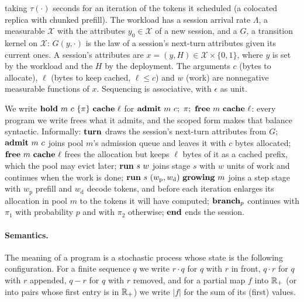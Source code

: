 \begin{definition}
taking $\tau(\cdot)$ seconds for an iteration of the tokens it scheduled
(a colocated replica with chunked prefill). The workload has a session arrival rate $\Lambda$, a
measurable  $\mathcal X$ with the attributes $y_0\in\mathcal X$ of
a new session, and a  $G$, a transition kernel on $\mathcal X$:
$G(y,\cdot)$ is the law of a session's next-turn attributes given its current ones. A
session's attributes are $x=(y,H)\in\mathcal X\times\{0,1\}$, where $y$ is set by the
workload and the  $H$ by the deployment. The arguments $c$ (bytes to
allocate), $\ell$ (bytes to keep cached, $\ell\le c$) and $w$ (work) are nonnegative
measurable functions of $x$. Sequencing is associative, with $\epsilon$ as unit.
\end{definition}

We write $\kw{hold}\ m\ c\ \{\pi\}\ \kw{cache}\ \ell$ for
$\kw{admit}\ m\ c;\ \pi;\ \kw{free}\ m\ \kw{cache}\ \ell$: every program we write
frees what it admits, and the scoped form makes that balance syntactic.
Informally: $\mathbf{turn}$ draws the session's next-turn attributes from $G$;
$\mathbf{admit}\ m\ c$ joins pool $m$'s admission queue and leaves it with $c$ bytes
allocated; $\kw{free}\ m\ \kw{cache}\ \ell$ frees the allocation but keeps $\ell$ bytes
of it as a cached prefix, which the pool may evict later; $\mathbf{run}\ s\ w$ joins stage
$s$ with $w$ units of work and continues when the work is done;
$\kw{run}\ s\ (w_{\mathrm p},w_{\mathrm d})\ \kw{growing}\ m$ joins a step stage with
$w_{\mathrm p}$ prefill and $w_{\mathrm d}$ decode tokens, and before each iteration
enlarges its allocation in pool $m$ to the tokens it will have computed; $\mathbf{branch}_p$
continues with $\pi_1$ with probability $p$ and with $\pi_2$ otherwise; $\mathbf{end}$ ends
the session.

\paragraph{Semantics.} The meaning of a program is a stochastic process whose state is
the following configuration. For a finite sequence $q$ we write $r\cdot q$ for $q$
with $r$ in front, $q\cdot r$ for $q$ with $r$ appended, $q-r$ for $q$ with $r$ removed,
and for a partial map $f$ into $\mathbb{R}_+$ (or into pairs whose first entry is in $\mathbb{R}_+$) we
write $|f|$ for the sum of its (first) values.

